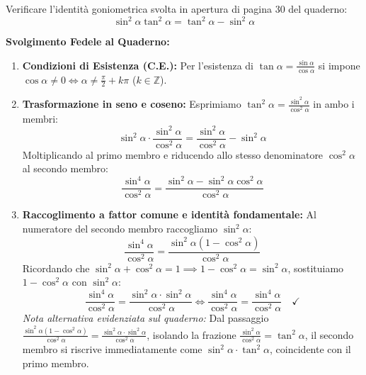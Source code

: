 \documentclass[11pt,a4paper,oneside]{report}
\begin{document}
\begin{esercizio}
Verificare l'identità goniometrica svolta in apertura di pagina 30 del quaderno:
\begin{equation}
    \sin^2\alpha \tan^2\alpha = \tan^2\alpha - \sin^2\alpha
\end{equation}

\textbf{Svolgimento Fedele al Quaderno:}
\begin{enumerate}
    \item \textbf{Condizioni di Esistenza (C.E.):} Per l'esistenza di $\tan\alpha = \frac{\sin\alpha}{\cos\alpha}$ si impone $\cos\alpha \neq 0 \iff \alpha \neq \frac{\pi}{2} + k\pi$ ($k \in \mathbb{Z}$).
    \item \textbf{Trasformazione in seno e coseno:} Esprimiamo $\tan^2\alpha = \frac{\sin^2\alpha}{\cos^2\alpha}$ in ambo i membri:
    \begin{equation*}
        \sin^2\alpha \cdot \frac{\sin^2\alpha}{\cos^2\alpha} = \frac{\sin^2\alpha}{\cos^2\alpha} - \sin^2\alpha
    \end{equation*}
    Moltiplicando al primo membro e riducendo allo stesso denominatore $\cos^2\alpha$ al secondo membro:
    \begin{equation*}
        \frac{\sin^4\alpha}{\cos^2\alpha} = \frac{\sin^2\alpha - \sin^2\alpha\cos^2\alpha}{\cos^2\alpha}
    \end{equation*}
    \item \textbf{Raccoglimento a fattor comune e identità fondamentale:}
    Al numeratore del secondo membro raccogliamo $\sin^2\alpha$:
    \begin{equation*}
        \frac{\sin^4\alpha}{\cos^2\alpha} = \frac{\sin^2\alpha\left(1 - \cos^2\alpha\right)}{\cos^2\alpha}
    \end{equation*}
    Ricordando che $\sin^2\alpha + \cos^2\alpha = 1 \implies 1 - \cos^2\alpha = \sin^2\alpha$, sostituiamo $1 - \cos^2\alpha$ con $\sin^2\alpha$:
    \begin{equation*}
        \frac{\sin^4\alpha}{\cos^2\alpha} = \frac{\sin^2\alpha \cdot \sin^2\alpha}{\cos^2\alpha} \iff \frac{\sin^4\alpha}{\cos^2\alpha} = \frac{\sin^4\alpha}{\cos^2\alpha} \quad \checkmark
    \end{equation*}
    \emph{Nota alternativa evidenziata sul quaderno:} Dal passaggio $\frac{\sin^2\alpha(1 - \cos^2\alpha)}{\cos^2\alpha} = \frac{\sin^2\alpha \cdot \sin^2\alpha}{\cos^2\alpha}$, isolando la frazione $\frac{\sin^2\alpha}{\cos^2\alpha} = \tan^2\alpha$, il secondo membro si riscrive immediatamente come $\sin^2\alpha \cdot \tan^2\alpha$, coincidente con il primo membro.
\end{enumerate}
\end{esercizio}
\end{document}
